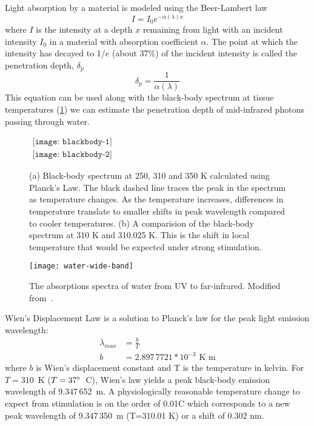 Light absorption by a material is modeled using the Beer-Lambert law
\begin{equation}
  I = I_0 e^{-\alpha (\lambda) x} \label{eq:beerlambert}
\end{equation}
where $I$ is the intensity at a depth $x$ remaining from light with an incident intensity $I_0$ in a material with absorption coefficient $\alpha$.  The point at which the intensity has decayed to 1/$e$ (about 37\%) of the incident intensity is called the penetration depth, $\delta_{p}$
\begin{equation}
  \delta_p = \frac{1}{\alpha (\lambda)} \label{eq:penetrationdepth}
\end{equation}
This equation can be used along with the black-body spectrum at tissue temperatures (\cref{fig:blackbody}) we can estimate the penetration depth of mid-infrared photons passing through water.

\begin{figure}[p]
  \centering
  $ 
	\begin{array}{c}
		\texttt{[image: blackbody-1]} \\
		\texttt{[image: blackbody-2]} 
	\end{array}
	$
  \caption[Black-body Spectrum at 250, 310 and 350 K]{\label{fig:blackbody}(a) Black-body spectrum at 250, 310 and 350 K calculated using Planck's Law. The black dashed line traces the peak in the spectrum as temperature changes.  As the temperature increases, differences in temperature translate to smaller shifts in peak wavelength compared to cooler temperatures. (b) A comparision of the black-body spectrum at 310 K and 310.025 K.  This is the shift in local temperature that would be expected under strong stimulation.}
\end{figure}
\begin{figure}[tb]
  \centering
  \texttt{[image: water-wide-band]}
  \caption[Wide-band absorption spectra of water]{\label{fig:waterabs}The absorptions spectra of water from UV to far-infrared.  Modified from~\citet{hale73}.}
\end{figure}

Wien's Displacement Law is a solution to Planck's law for the peak light emission wavelength:
\begin{align}
  \lambda_{max} &= \frac{b}{T} \label{eq:wienslaw} \\
  b &= 2.897\,7721 * 10^{-3} \mbox{ K m} \nonumber
\end{align}
where $b$ is Wien's displacement constant and T is the temperature in kelvin.  For $T=310$~K ($T=37^\circ$~C), Wien's law yields a peak black-body emission wavelength of 9.347$\,$652~\textmu m. A physiologically reasonable temperature change to expect from stimulation is on the order of 0.01\degree C which corresponds to a new peak wavelength of 9.347$\,$350~\textmu m (T=310.01 K) or a shift of 0.302 nm.

